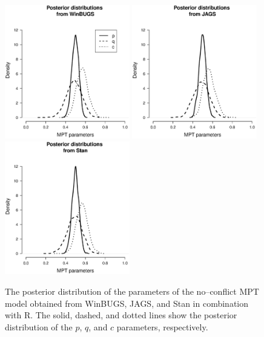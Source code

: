 \begin{figure}[!t]
\centering
\includegraphics[width=0.485\textwidth]{figs/bi3_mpt_posteriors.eps}
\includegraphics[width=0.485\textwidth]{figs/bi3_mpt_posteriors_jags.eps}
\includegraphics[width=0.485\textwidth]{figs/bi3_mpt_posteriors_stan.eps}
\caption{The posterior distribution of the parameters of the no--conflict MPT model obtained from WinBUGS, JAGS, and Stan in combination with R. The solid, dashed, and dotted lines show the posterior distribution of the $p$, $q$, and $c$ parameters, respectively.}\label{fig:bi3:mpt_post}
\end{figure} 



